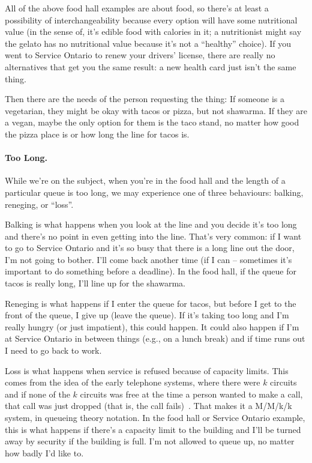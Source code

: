 \documentclass[a4paper]{report}
\begin{document}
All of the above food hall examples are about food, so there's at least a possibility of interchangeability because every option will have some nutritional value (in the sense of, it's edible food with calories in it; a nutritionist might say the gelato has no nutritional value because it's not a ``healthy'' choice). If you went to Service Ontario to renew your drivers' license, there are really no alternatives that get you the same result: a new health card just isn't the same thing.

Then there are the needs of the person requesting the thing:  If someone is a vegetarian, they might be okay with tacos or pizza, but not shawarma. If they are a vegan, maybe the only option for them is the taco stand, no matter how good the pizza place is or how long the line for tacos is.

\paragraph{Too Long.} 
While we're on the subject, when you're in the food hall and the length of a particular queue is too long, we may experience one of three behaviours: balking, reneging, or ``loss''. 

Balking is what happens when you look at the line and you decide it's too long and there's no point in even getting into the line. That's very common: if I want to go to Service Ontario and it's so busy that there is a long line out the door, I'm not going to bother. I'll come back another time (if I can -- sometimes it's important to do something before a deadline). In the food hall, if the queue for tacos is really long, I'll line up for the shawarma. 

Reneging is what happens if I enter the queue for tacos, but before I get to the front of the queue, I give up (leave the queue). If it's taking too long and I'm really hungry (or just impatient), this could happen. It could also happen if I'm at Service Ontario in between things (e.g., on a lunch break) and if time runs out I need to go back to work.

Loss is what happens when service is refused because of capacity limits. This comes from the idea of the early telephone systems, where there were $k$ circuits and if none of the $k$ circuits was free at the time a person wanted to make a call, that call was just dropped (that is, the call fails)~\cite{pmd}. That makes it a M/M/k/k system, in queueing theory notation. In the food hall or Service Ontario example, this is what happens if there's a capacity limit to the building and I'll be turned away by security if the building is full. I'm not allowed to queue up, no matter how badly I'd like to.
\end{document}
